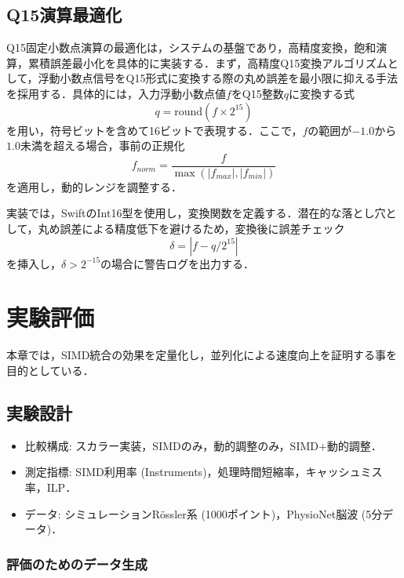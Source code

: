 \documentclass[10pt,journal,compsoc]{IEEEtran}
\begin{document}
\subsection{Q15演算最適化}

Q15固定小数点演算の最適化は，システムの基盤であり，高精度変換，飽和演算，累積誤差最小化を具体的に実装する．まず，高精度Q15変換アルゴリズムとして，浮動小数点信号をQ15形式に変換する際の丸め誤差を最小限に抑える手法を採用する．具体的には，入力浮動小数点値$f$をQ15整数$q$に変換する式
\begin{equation}
q = \text{round}(f \times 2^{15})
\end{equation}
を用い，符号ビットを含めて16ビットで表現する．ここで，$f$の範囲が$-1.0$から$1.0$未満を超える場合，事前の正規化
\begin{equation}
f_{norm} = \frac{f}{\max(|f_{max}|, |f_{min}|)}
\end{equation}
を適用し，動的レンジを調整する．

実装では，SwiftのInt16型を使用し，変換関数を定義する．潜在的な落とし穴として，丸め誤差による精度低下を避けるため，変換後に誤差チェック
\begin{equation}
\delta = |f - q/2^{15}|
\end{equation}
を挿入し，$\delta > 2^{-15}$の場合に警告ログを出力する．

\section{実験評価}

本章では，SIMD統合の効果を定量化し，並列化による速度向上を証明する事を目的としている．

\subsection{実験設計}

\begin{itemize}
\item 比較構成: スカラー実装，SIMDのみ，動的調整のみ，SIMD+動的調整．
\item 測定指標: SIMD利用率 (Instruments)，処理時間短縮率，キャッシュミス率，ILP．
\item データ: シミュレーションRössler系 (1000ポイント)，PhysioNet脳波 (5分データ)．
\end{itemize}

\subsubsection{評価のためのデータ生成}
\end{document}
